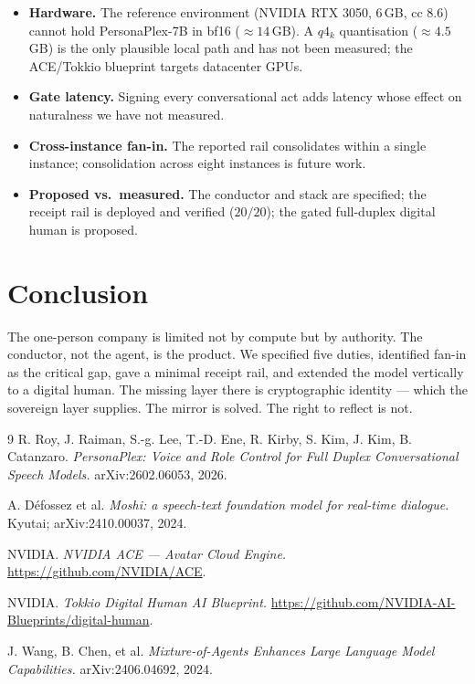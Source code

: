 \documentclass[11pt]{article}
\begin{document}
\begin{itemize}[leftmargin=*]
  \item \textbf{Hardware.} The reference environment (NVIDIA RTX 3050, 6\,GB, cc
        8.6) cannot hold PersonaPlex-7B in bf16 ($\approx 14$\,GB). A $q4_k$
        quantisation ($\approx 4.5$\,GB) is the only plausible local path and has
        not been measured; the ACE/Tokkio blueprint targets datacenter GPUs.
  \item \textbf{Gate latency.} Signing every conversational act adds latency whose
        effect on naturalness we have not measured.
  \item \textbf{Cross-instance fan-in.} The reported rail consolidates within a
        single instance; consolidation across eight instances is future work.
  \item \textbf{Proposed vs.\ measured.} The conductor and stack are specified;
        the receipt rail is deployed and verified ($20/20$); the gated full-duplex
        digital human is proposed.
\end{itemize}

\section{Conclusion}

The one-person company is limited not by compute but by authority. The conductor,
not the agent, is the product. We specified five duties, identified fan-in as the
critical gap, gave a minimal receipt rail, and extended the model vertically to a
digital human. The missing layer there is cryptographic identity --- which the
sovereign layer supplies. The mirror is solved. The right to reflect is not.

\begin{thebibliography}{9}
 R. Roy, J. Raiman, S.-g. Lee, T.-D. Ene, R. Kirby, S. Kim,
J. Kim, B. Catanzaro. \emph{PersonaPlex: Voice and Role Control for Full Duplex
Conversational Speech Models.} arXiv:2602.06053, 2026.

 A. D\'efossez et al. \emph{Moshi: a speech-text foundation model
for real-time dialogue.} Kyutai; arXiv:2410.00037, 2024.

 NVIDIA. \emph{NVIDIA ACE --- Avatar Cloud Engine.}
\url{https://github.com/NVIDIA/ACE}.

 NVIDIA. \emph{Tokkio Digital Human AI Blueprint.}
\url{https://github.com/NVIDIA-AI-Blueprints/digital-human}.

 J. Wang, B. Chen, et al. \emph{Mixture-of-Agents Enhances Large
Language Model Capabilities.} arXiv:2406.04692, 2024.
\end{thebibliography}
\end{document}
